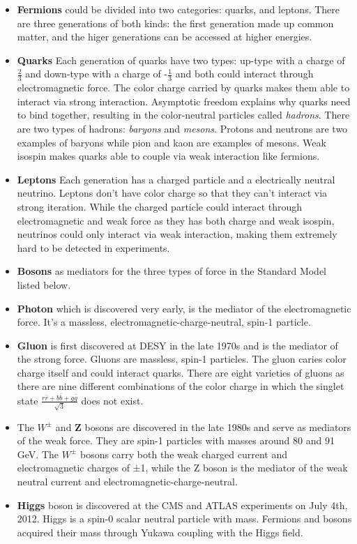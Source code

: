 \begin{itemize}
  \item \textbf{Fermions} could be divided into two categories: quarks, and leptons. There are three generations of both kinds: the first generation made up common matter, and the higer generations can be accessed at higher energies.
  \item \textbf{Quarks} Each generation of quarks have two types: up-type with a charge of $\frac{2}{3}$ and down-type with a charge of -$\frac{1}{3}$ and both could interact through electromagnetic force. The color charge carried by quarks makes them able to 
interact via strong interaction. Asymptotic freedom explains why quarks need to bind together, resulting in the color-neutral particles called \textit{hadrons}. There are two types of hadrons: \textit{baryons} and \textit{mesons}. Protons and neutrons are two examples of baryons while pion and kaon are examples of mesons. Weak isospin makes quarks able to couple via weak interaction like fermions.
  \item \textbf{Leptons} Each generation has a charged particle and a electrically neutral neutrino. Leptons don't have color charge so that they can't interact via strong iteration. While the charged particle could interact through electromagnetic and weak force as they has both charge and weak isospin, neutrinos could only interact via weak interaction, making them extremely hard to be detected in experiments.
  \item \textbf{Bosons} as mediators for the three types of force in the Standard Model listed below.
  \item \textbf{Photon} which is discovered very early, is the mediator of the electromagnetic force. It's a massless, electromagnetic-charge-neutral, spin-1 particle.
  \item \textbf{Gluon} is first discovered at DESY in the late 1970s and is the mediator of the strong force. Gluons are massless, spin-1 particles. The gluon caries color charge itself and could interact quarks. There are eight varieties of gluons as there are nine different combinations of the color charge in which the singlet state $\frac{r\bar{r}+b\bar{b}+g\bar{g}}{\sqrt{3}}$ does not exist.

  \item The \textbf{$W^{\pm}$} and \textbf{Z} bosons are discovered in the late 1980s and serve as mediators of the weak force. They are spin-1 particles with masses around 80 and 91 GeV. The \textbf{$W^{\pm}$} bosons carry both the weak charged current and electromagnetic charges of ±1, while the Z boson is the mediator of the weak neutral current and electromagnetic-charge-neutral. 
  \item \textbf{Higgs} boson is discovered at the CMS and ATLAS experiments on July 4th, 2012\cite{Aad:2012tfa}\cite{Chatrchyan:2012xdj}. Higgs is a spin-0 scalar neutral particle with mass. Fermions and bosons acquired their mass through Yukawa coupling with the Higgs field. 
\end{itemize}

